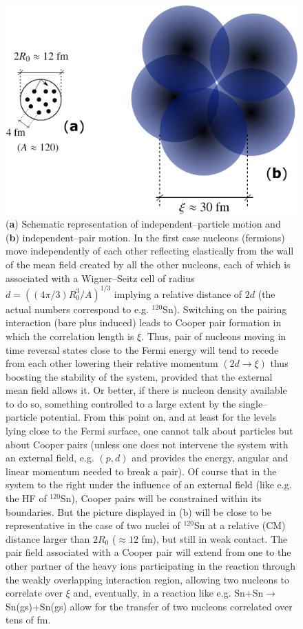 \begin{figure}
\centerline{\includegraphics*[width=14cm,angle=0]{nutshell/figs/fig3_1_4.pdf}}
\caption{(\textbf{a}) Schematic representation of independent--particle motion and (\textbf{b}) independent--pair motion. In the first case nucleons (fermions) move independently of each other reflecting elastically from the wall of the mean field created by all the other nucleons, each of which is associated with a Wigner--Seitz cell of radius $d=\left((4\pi/3)R_0^3/A\right)^{1/3}$ implying a relative distance of $2d$ (the actual numbers correspond to e.g. $^{120}$Sn). Switching on the pairing interaction (bare plus induced) leads to Cooper pair formation in which the correlation length is $\xi$. Thus, pair of nucleons moving in time reversal states close to the Fermi energy will tend to recede from each other lowering their relative momentum $(2d\rightarrow \xi)$ thus boosting the stability of the system, provided that the external mean field allows it. Or better, if  there is nucleon density available to do so, something controlled to a large extent by the single--particle potential. From this point on, and at least for the levels lying close to the Fermi surface, one cannot talk about particles but about Cooper pairs (unless one does not intervene the system with an external field, e.g. $(p,d)$ and provides the energy, angular and linear momentum needed to break a pair). Of course that in the system to the right under the influence of an external field (like e.g. the HF of $^{120}$Sn), Cooper pairs will be constrained within its boundaries. But the picture displayed in (b) will be close to be representative  in the case of two nuclei of $^{120}$Sn at a relative (CM) distance larger than $2R_0$ ($\approx 12$ fm), but still in weak contact. The pair field associated with a Cooper pair will extend from one to the other partner of the heavy ions participating in the reaction through the weakly overlapping interaction region, allowing two nucleons to correlate over $\xi$ and, eventually, in a reaction like e.g. Sn+Sn$\rightarrow$ Sn(gs)+Sn(gs) allow for the transfer of two nucleons correlated over tens of fm.}\label{fig3.2.1}
\end{figure}
